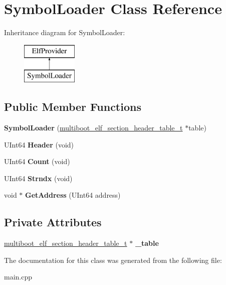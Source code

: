 \hypertarget{class_symbol_loader}{}\section{Symbol\+Loader Class Reference}
\label{class_symbol_loader}
Inheritance diagram for Symbol\+Loader\+:\begin{figure}[H]
\begin{center}
\leavevmode
\includegraphics[height=2.000000cm]{class_symbol_loader}
\end{center}
\end{figure}
\subsection*{Public Member Functions}
\begin{DoxyCompactItemize}
\item 
\mbox{\label{class_symbol_loader_a5c07457db068ed06a45602a61b27c5f0}} 
{\bfseries Symbol\+Loader} (\hyperlink{structmultiboot__elf__section__header__table}{multiboot\+\_\+elf\+\_\+section\+\_\+header\+\_\+table\+\_\+t} $\ast$table)
\item 
\mbox{\label{class_symbol_loader_ae26ffd891cf15d44164e62ac034160c8}} 
U\+Int64 {\bfseries Header} (void)
\item 
\mbox{\label{class_symbol_loader_a2c0ed485c4dc63bfb1e7fb0237909590}} 
U\+Int64 {\bfseries Count} (void)
\item 
\mbox{\label{class_symbol_loader_a1c316438ee8bf8994592e2eadf0dcdd5}} 
U\+Int64 {\bfseries Strndx} (void)
\item 
\mbox{\label{class_symbol_loader_a79976db7188435ace6fc602facc09a63}} 
void $\ast$ {\bfseries Get\+Address} (U\+Int64 address)
\end{DoxyCompactItemize}
\subsection*{Private Attributes}
\begin{DoxyCompactItemize}
\item 
\mbox{\label{class_symbol_loader_ab41e3bb36fbd203fffa36c7af729f3d5}} 
\hyperlink{structmultiboot__elf__section__header__table}{multiboot\+\_\+elf\+\_\+section\+\_\+header\+\_\+table\+\_\+t} $\ast$ {\bfseries \+\_\+table}
\end{DoxyCompactItemize}


The documentation for this class was generated from the following file\+:\begin{DoxyCompactItemize}
\item 
main.\+cpp\end{DoxyCompactItemize}
